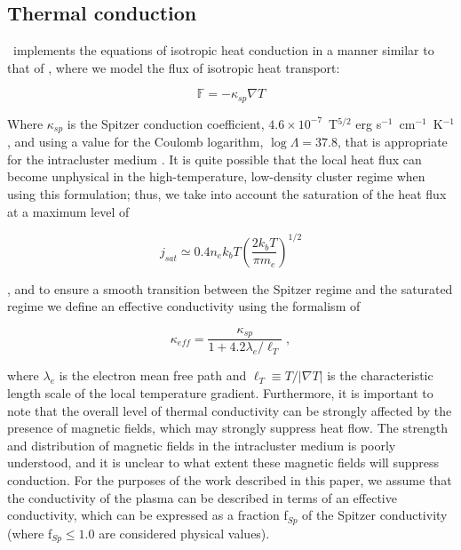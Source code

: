 \subsection{Thermal conduction}
\label{sec.num.conductions}

\enzo\ implements the equations of isotropic heat conduction in a manner
similar to that of \citet{2007ApJ...664..135P}, where we model the
flux of isotropic heat transport:

\begin{equation}
\mathbb{F} = -\kappa_{sp} \nabla T
\end{equation}

Where $\kappa_{sp}$ is the Spitzer conduction coefficient, $4.6 \times 10^{-7}$~T$^{5/2}$ erg
s$^{-1}$~cm$^{-1}$~K$^{-1}$ \citep{1962pfig.book.....S}, and using a
value for the Coulomb logarithm, $\log \Lambda = 37.8$, that is
appropriate for the intracluster medium \citep{1988xrec.book.....S}.
It is quite possible that the local heat flux can become unphysical in
the high-temperature, low-density cluster regime when using this
formulation; thus, we take into account the saturation of the heat
flux at a maximum level of

\begin{equation}
j_{sat} \simeq 0.4 n_e k_b T \left( \frac{2 k_b T}{\pi m_e} \right)^{1/2}
\end{equation}

\citep{1977ApJ...211..135C}, and to ensure a smooth transition between
the Spitzer regime and the saturated regime we define an effective
conductivity using the formalism of \citet{1988xrec.book.....S}

\begin{equation}
\kappa_{eff} = \frac{\kappa_{sp}}{1 + 4.2 \lambda_e / \ell_T} \; ,
\end{equation}

where $\lambda_e$ is the electron mean free path and $\ell_T \equiv T
/ |\nabla T|$ is the characteristic length scale of the local
temperature gradient.  Furthermore, it is important to note that the
overall level of thermal conductivity can be strongly affected
by the presence of magnetic fields, which may strongly suppress heat
flow.  The strength and distribution of magnetic fields in the
intracluster medium is poorly understood, and it is unclear to what
extent these magnetic fields will suppress conduction.  For the
purposes of the work described in this paper, we assume that the
conductivity of the plasma can be described in terms of an effective
conductivity, which can be expressed as a fraction f$_{Sp}$ of the
Spitzer conductivity (where f$_{Sp} \leq 1.0$ are considered physical
values).


